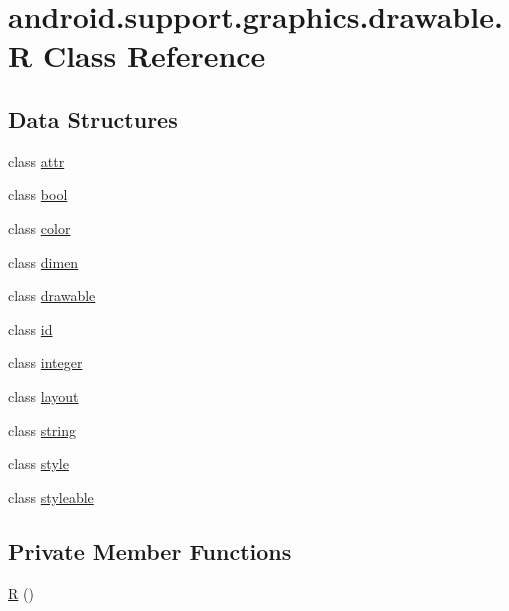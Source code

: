 \hypertarget{classandroid_1_1support_1_1graphics_1_1drawable_1_1_r}{}\section{android.\+support.\+graphics.\+drawable.\+R Class Reference}
\label{classandroid_1_1support_1_1graphics_1_1drawable_1_1_r}
\subsection*{Data Structures}
\begin{DoxyCompactItemize}
\item 
class \mbox{\hyperlink{classandroid_1_1support_1_1graphics_1_1drawable_1_1_r_1_1attr}{attr}}
\item 
class \mbox{\hyperlink{classandroid_1_1support_1_1graphics_1_1drawable_1_1_r_1_1bool}{bool}}
\item 
class \mbox{\hyperlink{classandroid_1_1support_1_1graphics_1_1drawable_1_1_r_1_1color}{color}}
\item 
class \mbox{\hyperlink{classandroid_1_1support_1_1graphics_1_1drawable_1_1_r_1_1dimen}{dimen}}
\item 
class \mbox{\hyperlink{classandroid_1_1support_1_1graphics_1_1drawable_1_1_r_1_1drawable}{drawable}}
\item 
class \mbox{\hyperlink{classandroid_1_1support_1_1graphics_1_1drawable_1_1_r_1_1id}{id}}
\item 
class \mbox{\hyperlink{classandroid_1_1support_1_1graphics_1_1drawable_1_1_r_1_1integer}{integer}}
\item 
class \mbox{\hyperlink{classandroid_1_1support_1_1graphics_1_1drawable_1_1_r_1_1layout}{layout}}
\item 
class \mbox{\hyperlink{classandroid_1_1support_1_1graphics_1_1drawable_1_1_r_1_1string}{string}}
\item 
class \mbox{\hyperlink{classandroid_1_1support_1_1graphics_1_1drawable_1_1_r_1_1style}{style}}
\item 
class \mbox{\hyperlink{classandroid_1_1support_1_1graphics_1_1drawable_1_1_r_1_1styleable}{styleable}}
\end{DoxyCompactItemize}
\subsection*{Private Member Functions}
\begin{DoxyCompactItemize}
\item 
\mbox{\hyperlink{classandroid_1_1support_1_1graphics_1_1drawable_1_1_r_a5cc28100d772dee9f3d968e4e284eec3}{R}} ()
\end{DoxyCompactItemize}


